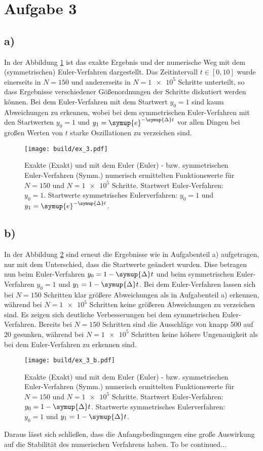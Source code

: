 \section*{Aufgabe 3}
\subsection*{a)}
In der Abbildung \ref{fig:euler} ist das exakte Ergebnis und der numerische Weg mit dem (symmetrischen)
Euler-Verfahren dargestellt.
Das Zeitintervall $t \in [0, 10]$ wurde einerseits in $N = 150$ und andererseits in $N = \num{1e5}$ Schritte 
unterteilt, so dass Ergebnisse verschiedener Gößenordnungen der Schritte diskutiert werden können.
Bei dem Euler-Verfahren mit dem Startwert $y_0 = 1$ sind kaum Abweichungen zu erkennen, wobei 
bei dem symmetrischen Euler-Verfahren mit den Startwerten $y_0 = 1$ und $y_1 = \symup{e}^{-\symup{\Delta}t}$ vor allen Dingen bei großen Werten von $t$ 
starke Oszillationen zu verzeichen sind.
\begin{figure}
    \centering
    \texttt{[image: build/ex\_3.pdf]}
    \caption{Exakte (Exakt) und mit dem Euler (Euler) - bzw. symmetrischen Euler-Verfahren (Symm.) numerisch ermittelten Funktionswerte für
    $N = 150$ und $N = \num{1e5}$ Schritte. 
    Startwert Euler-Verfahren: $y_0 = 1$. Startwerte symmetrisches Eulerverfahren: $y_0 = 1$ und $y_1 = \symup{e}^{-\symup{\Delta}t}$.}
    \label{fig:euler}
\end{figure} 
\subsection*{b)}
In der Abbildung \ref{fig:euler_b} sind erneut die Ergebnisse wie in Aufgabenteil a) aufgetragen, nur mit dem Unterschied, dass 
die Startwerte geändert wurden.
Dise betragen nun beim Euler-Verfahren $y_0 = 1 - \symup{\Delta}t$ und beim symmetrischen Euler-Verfahren 
$y_0 = 1$ und $y_1 = 1 - \symup{\Delta}t$.
Bei dem Euler-Verfahren lassen sich bei $N=150$ Schritten klar größere Abweichungen als in Aufgabenteil a) erkennen, während bei $N = \num{1e5}$
Schritten keine größeren Abweichungen zu verzeichen sind.
Es zeigen sich deutliche Verbesserungen bei dem symmetrischen Euler-Verfahren. 
Bereits bei $N = 150$ Schritten sind die Ausschläge von knapp 500 auf 20 gesunken, 
während bei $N = \num{1e5}$ Schritten keine höhere Ungenauigkeit als bei dem Euler-Verfahren zu erkennen sind.
\begin{figure}
    \centering
    \texttt{[image: build/ex\_3\_b.pdf]}
    \caption{Exakte (Exakt) und mit dem Euler (Euler) - bzw. symmetrischen Euler-Verfahren (Symm.) numerisch ermittelten Funktionswerte für
    $N = 150$ und $N = \num{1e5}$ Schritte.
    Startwert Euler-Verfahren: $y_0 = 1 - \symup{\Delta}t$. 
    Startwerte symmetrisches Eulerverfahren: $y_0 = 1$ und $y_1 = 1 - \symup{\Delta}t$.}
    \label{fig:euler_b}
\end{figure}
Daraus lässt sich schließen, dass die Anfangsbedingungen eine große Auswirkung auf die Stabilität des numerischen Verfahrens haben.
To be continued...